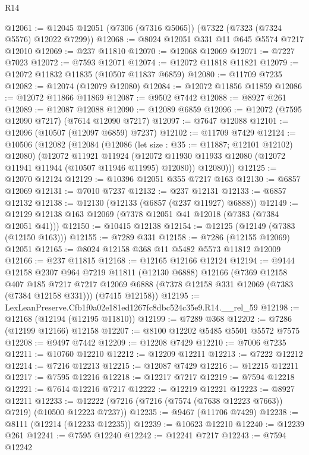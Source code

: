 \begin{lexlean}{R14}
\begin{coremodule}
@12061 := @12045 @12051 (@7306 (@7316 @5065)) (@7322 (@7323 (@7324 @5576) @12022 @7299))
@12068 := @8024 @12051 @331 @11 @645 @5574 @7217 @12010
@12069 := @237 @11810
@12070 := @12068 @12069
@12071 := @7227 @7023
@12072 := @7593 @12071
@12074 := @12072 @11818 @11821
@12079 := @12072 @11832 @11835 (@10507 @11837 @6859)
@12080 := @11709 @7235
@12082 := @12074 (@12079 @12080)
@12084 := @12072 @11856 @11859
@12086 := @12072 @11866 @11869
@12087 := @9502 @7442
@12088 := @8927 @261
@12089 := @12087 @12088
@12090 := @12089 @6859
@12096 := @12072 (@7595 @12090 @7217) (@7614 @12090 @7217)
@12097 := @7647 @12088
@12101 := @12096 (@10507 (@12097 @6859) @7237)
@12102 := @11709 @7429
@12124 := @10506
    (@12082
      (@12084
        (@12086 (let size : @35 := @11887; @12101 @12102) @12080)
        (@12072
          @11921
          @11924
          (@12072 @11930 @11933 @12080 (@12072 @11941 @11944 (@10507 @11946 @11995) @12080))
          @12080)))
@12125 := @12070 @12124
@12129 := @10396 @12051 @355 @7217 @163
@12130 := @6857 @12069
@12131 := @7010 @7237
@12132 := @237 @12131
@12133 := @6857 @12132
@12138 := @12130 (@12133 (@6857 (@237 @11927) @6888))
@12149 := @12129 @12138 @163 @12069 (@7378 @12051 @41 @12018 (@7383 (@7384 @12051 @41)))
@12150 := @10415 @12138
@12154 := @12125 (@12149 (@7383 (@12150 @163)))
@12155 := @7289 @331
@12158 := @7286 (@12155 @12069) @12051
@12165 := @8024 @12158 @368 @11 @5482 @5573 @11812 @12009
@12166 := @237 @11815
@12168 := @12165 @12166 @12124
@12194 := @9144
    @12158
    @2307
    @964
    @7219
    @11811
    (@12130 @6888)
    @12166
    (@7369
      @12158
      @407
      @185
      @7217
      @7217
      @12069
      @6888
      (@7378 @12158 @331 @12069 (@7383 (@7384 @12158 @331)))
      (@7415 @12158))
@12195 := LexLeanPreserve.Cfb1f0a02e181ed1267fc8dbc524c35e9.R14.__rel_59
@12198 := @12168 (@12194 (@12195 @11810))
@12199 := @7289 @368
@12202 := @7286 (@12199 @12166) @12158
@12207 := @8100 @12202 @5485 @5501 @5572 @7575
@12208 := @9497 @7442
@12209 := @12208 @7429
@12210 := @7006 @7235
@12211 := @10760 @12210
@12212 := @12209 @12211
@12213 := @7222 @12212
@12214 := @7216 @12213
@12215 := @12087 @7429
@12216 := @12215 @12211
@12217 := @7595 @12216
@12218 := @12217 @7217
@12219 := @7594 @12218
@12221 := @7614 @12216 @7217
@12222 := @12219 @12221
@12223 := @8927 @12211
@12233 := @12222 (@7216 (@7216 (@7574 (@7638 @12223 @7663)) @7219) (@10500 @12223 @7237))
@12235 := @9467 (@11706 @7429)
@12238 := @8111 (@12214 (@12233 @12235))
@12239 := @10623 @12210
@12240 := @12239 @261
@12241 := @7595 @12240
@12242 := @12241 @7217
@12243 := @7594 @12242

\end{coremodule}
\end{lexlean}
